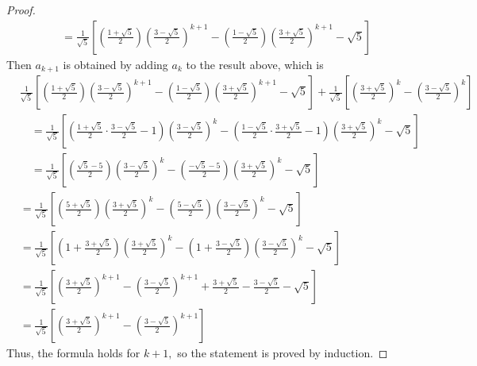 \documentclass{article}
\begin{document}
\begin{itemize}
\begin{enumerate}[(a)]
\begin{proof}
\begin{align*}
						&\quad = \frac{1}{\sqrt{5}}\left[ \left( \frac{1+\sqrt{5}}{2} \right) \left( \frac{3-\sqrt{5}}{2} \right)^{k+1}- \left( \frac{1-\sqrt{5}}{2} \right)\left( \frac{3+\sqrt{5}}{2} \right)^{k+1} - \sqrt{5}\right]
					\end{align*}
					Then $a_{k+1}$ is obtained by adding $a_k$ to the result above, which is
					\begin{align*}
						&\frac{1}{\sqrt{5}}\left[ \left( \frac{1+\sqrt{5}}{2} \right) \left( \frac{3-\sqrt{5}}{2} \right)^{k+1}- \left( \frac{1-\sqrt{5}}{2} \right)\left( \frac{3+\sqrt{5}}{2} \right)^{k+1} - \sqrt{5}\right] + \frac{1}{\sqrt{5}} \left[ \left( \frac{3+\sqrt{5}}{2}  \right)^k - \left( \frac{3-\sqrt{5}}{2} \right)^k\right] \\
						&\quad=\frac{1}{\sqrt{5}}\left[ \left( \frac{1+\sqrt{5}}{2}\cdot \frac{3-\sqrt{5}}{2} - 1 \right)\left( \frac{3-\sqrt{5}}{2} \right)^k - \left( \frac{1-\sqrt{5}}{2}\cdot \frac{3+\sqrt{5}}{2} -1 \right)\left( \frac{3+\sqrt{5}}{2} \right)^k - \sqrt{5}\right] \\
						&\quad= \frac{1}{\sqrt{5}}\left[ \left( \frac{\sqrt{5}-5}{2} \right)\left( \frac{3-\sqrt{5}}{2} \right)^k - \left( \frac{-\sqrt{5}-5}{2} \right)\left( \frac{3+\sqrt{5}}{2} \right)^k - \sqrt{5} \right] \\
						&= \frac{1}{\sqrt{5}}\left[ \left( \frac{5+\sqrt{5}}{2} \right)\left( \frac{3+\sqrt{5}}{2} \right)^k - \left( \frac{5-\sqrt{5}}{2} \right)\left( \frac{3-\sqrt{5}}{2} \right)^k - \sqrt{5} \right] \\
						&= \frac{1}{\sqrt{5}}\left[ \left( 1+\frac{3+\sqrt{5}}{2} \right)\left( \frac{3+\sqrt{5}}{2} \right)^k - \left( 1+\frac{3-\sqrt{5}}{2} \right)\left( \frac{3-\sqrt{5}}{2} \right)^k - \sqrt{5} \right] \\
						&= \frac{1}{\sqrt{5}}\left[ \left( \frac{3+\sqrt{5}}{2} \right)^{k+1} - \left( \frac{3-\sqrt{5}}{2} \right)^{k+1} + \frac{3+\sqrt{5}}{2} - \frac{3-\sqrt{5}}{2} - \sqrt{5} \right] \\
						&= \frac{1}{\sqrt{5}}\left[ \left( \frac{3+\sqrt{5}}{2} \right)^{k+1} - \left( \frac{3-\sqrt{5}}{2} \right)^{k+1} \right]
					\end{align*}
					Thus, the formula holds for $k+1,$ so the statement is proved by induction.
				\end{proof}
				
		\end{enumerate}


\end{itemize}
\end{document}
